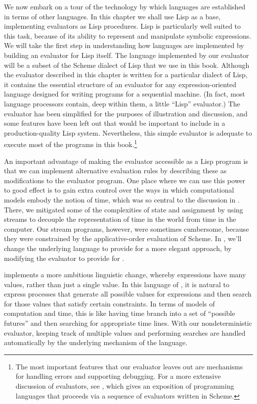 We now embark on a tour of the technology by which languages are established in
terms of other languages.  In this chapter we shall use Lisp as a base,
implementing evaluators as Lisp procedures.  Lisp is particularly well suited
to this task, because of its ability to represent and manipulate symbolic
expressions.  We will take the first step in understanding how languages are
implemented by building an evaluator for Lisp itself.  The language implemented
by our evaluator will be a subset of the Scheme dialect of Lisp that we use in
this book.  Although the evaluator described in this chapter is written for a
particular dialect of Lisp, it contains the essential structure of an evaluator
for any expression-oriented language designed for writing programs for a
sequential machine.  (In fact, most language processors contain, deep within
them, a little ``Lisp'' evaluator.)  The evaluator has been simplified for the
purposes of illustration and discussion, and some features have been left out
that would be important to include in a production-quality Lisp system.
Nevertheless, this simple evaluator is adequate to execute most of the programs
in this book.\footnote{The most important features that our evaluator leaves
out are mechanisms for handling errors and supporting debugging.  For a more
extensive discussion of evaluators, see , which
gives an exposition of programming languages that proceeds via a sequence of
evaluators written in Scheme.}

An important advantage of making the evaluator accessible as a Lisp program is
that we can implement alternative evaluation rules by describing these as
modifications to the evaluator program.  One place where we can use this power
to good effect is to gain extra control over the ways in which computational
models embody the notion of time, which was so central to the discussion in
.  There, we mitigated some of the complexities of state and
assignment by using streams to decouple the representation of time in the world
from time in the computer.  Our stream programs, however, were sometimes
cumbersome, because they were constrained by the applicative-order evaluation
of Scheme.  In , we'll change the underlying language to
provide for a more elegant approach, by modifying the evaluator to provide for
.

 implements a more ambitious linguistic change, whereby
expressions have many values, rather than just a single value.  In this
language of , it is natural to express
processes that generate all possible values for expressions and then search for
those values that satisfy certain constraints.  In terms of models of
computation and time, this is like having time branch into a set of ``possible
futures'' and then searching for appropriate time lines.  With our
nondeterministic evaluator, keeping track of multiple values and performing
searches are handled automatically by the underlying mechanism of the language.


